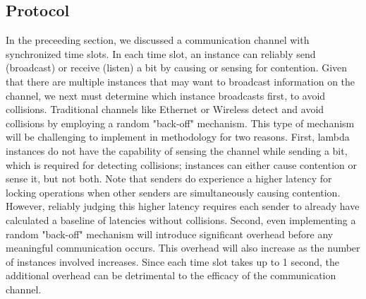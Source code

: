 \subsection{Protocol}
\label{sec:protocol}
In the preceeding section, we discussed a communication channel with
synchronized time slots. In each time slot, an instance can reliably send
(broadcast) or receive (listen) a bit by causing or sensing for contention.
Given that there are multiple instances that may want to broadcast information
on the channel, we next must determine which instance broadcasts first, to avoid
collisions.  Traditional channels like Ethernet or Wireless detect and avoid
collisions by employing a random "back-off" mechanism.
This type of mechanism will be challenging to implement in methodology for two
reasons.  First, lambda instances do not have the capability of sensing the
channel while sending a bit, which is required for detecting collisions;
instances can either cause contention or sense it, but not both. Note that
senders do experience a higher latency for locking operations when other senders
are simultaneously causing contention. However, reliably judging this higher
latency requires each sender to already have calculated a baseline of latencies
without collisions. Second, even implementing a
random "back-off" mechanism will introduce significant overhead before any
meaningful communication occurs. This overhead will also increase as the number
of instances involved increases. Since each time slot takes up to 1 second, the
additional overhead can be detrimental to the efficacy of the communication
channel.


